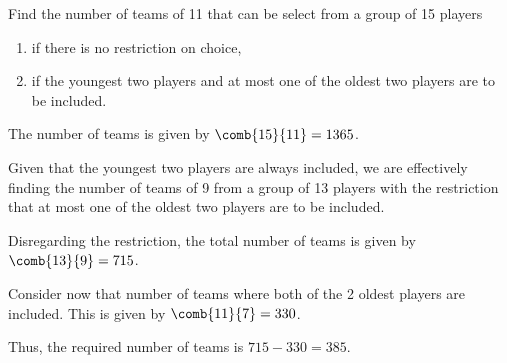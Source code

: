 \begin{problem}
    Find the number of teams of 11 that can be select from a group of 15 players
    \begin{enumerate}
        \item if there is no restriction on choice,
        \item if the youngest two players and at most one of the oldest two players are to be included.
    \end{enumerate}
\end{problem}
\begin{solution}
    \begin{ppart}
        The number of teams is given by $\comb{15}{11} = 1365$.
    \end{ppart}
    \begin{ppart}
        Given that the youngest two players are always included, we are effectively finding the number of teams of 9 from a group of 13 players with the restriction that at most one of the oldest two players are to be included.

        Disregarding the restriction, the total number of teams is given by $\comb{13}{9} = 715$.

        Consider now that number of teams where both of the 2 oldest players are included. This is given by $\comb{11}{7} = 330$.

        Thus, the required number of teams is $715 - 330 = 385$.
    \end{ppart}
\end{solution}

